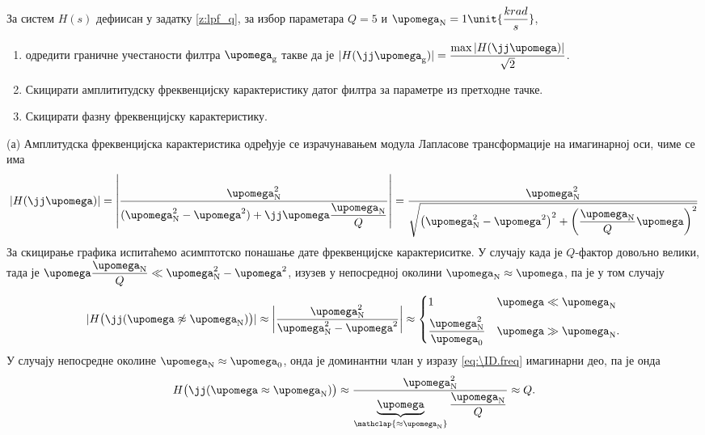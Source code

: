 \PID \label{z:lpq_q_ampl} \mnImportant
За систем $H(s)$ дефиисан у задатку \ref{z:lpf_q}, за избор параметара 
$Q = 5$ и $\upomega_{\rm N} = 1\unit{\dfrac{krad}{s}}$,
\begin{enumerate}[label=(\alph*)]
    \item одредити граничне учестаности филтра $\upomega_{\rm g}$ такве да је
    $|H(\jj\upomega_{\rm g})| = \dfrac{\max|H(\jj\upomega)|}{\sqrt 2}$.
    \item Скицирати амплититудску фреквенцијску карактеристику датог филтра за параметре из претходне тачке. 
    \item Скицирати фазну фреквенцијску карактеристику. 
\end{enumerate}

\RESENJE 
(а) Амплитудска фреквенцијска карактеристика одређује се израчунавањем модула Лапласове трансформације 
на имагинарној оси, чиме се има 
\begin{equation}
    |H(\jj\upomega)| =
    \left|
    \dfrac{\upomega_{\rm N}^2 }{(\upomega_{\rm N}^2 - \upomega^2) + \jj\upomega\dfrac{\upomega_{\rm N}}{Q}} 
    \right| 
    =
    \dfrac{\upomega_{\rm N}^2}{\sqrt{  
        \left(\upomega_{\rm N}^2 - \upomega^2\right)^2 
        +
        \left(
            \dfrac{\upomega_{\rm N}}{Q} \upomega
        \right)^2
    }}
    \label{eq:\ID.freq}
\end{equation}
За скицирање графика испитаћемо асимптотско понашање дате фреквенцијске карактериситке. 
У случају када је $Q$-фактор довољно велики, тада је 
$\upomega\dfrac{\upomega_{\rm N}}{Q} \ll \upomega_{\rm N}^2 - \upomega^2$, изузев у непосредној околини 
$\upomega_{\rm N} \approx \upomega$, па је у том случају
\begin{equation}
    | H \bigl( \jj(\upomega \not \approx \upomega_{\rm N}) \bigr) |\approx
    \left|
    \dfrac{\upomega_{\rm N}^2}{\upomega_{\rm N}^2 - \upomega^2}
    \right|
    \approx \begin{cases}
        1 & \upomega \ll \upomega_{\rm N} \\[2mm]
        \dfrac{\upomega_{\rm N}^2}{\upomega_0} & \upomega \gg \upomega_{\rm N}.
    \end{cases}
    \label{fig:\ID.outband}
\end{equation} 
У случају непосредне околине $\upomega_{\rm N}\approx \upomega_{0}$, онда је доминантни члан у изразу
\ref{eq:\ID.freq} имагинарни део, па је онда 
\begin{equation}
    H \bigl( \jj(\upomega \approx \upomega_{\rm N}) \bigr) \approx 
    \dfrac{\upomega_{\rm N}^2}{\underbrace{\upomega}_{\mathclap{\approx \upomega_{\rm N}}}\dfrac{\upomega_{\rm N}}{Q} }
    \approx Q. \label{fig:\ID.maxval}
\end{equation}
